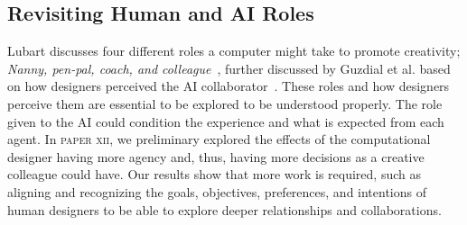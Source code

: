 




\subsection{Revisiting Human and AI Roles}


Lubart discusses four different roles a computer might take to promote creativity; \emph{Nanny, pen-pal, coach, and colleague}~\cite{lubart_how_2005}, further discussed by Guzdial et al. based on how designers perceived the AI collaborator~\cite{guzdial_friend_2019}. These roles and how designers perceive them are essential to be explored to be understood properly. The role given to the AI could condition the experience and what is expected from each agent. In \textsc{paper xii}, we preliminary explored the effects of the computational designer having more agency and, thus, having more decisions as a creative colleague could have. Our results show that more work is required, such as aligning and recognizing the goals, objectives, preferences, and intentions of human designers to be able to explore deeper relationships and collaborations.


